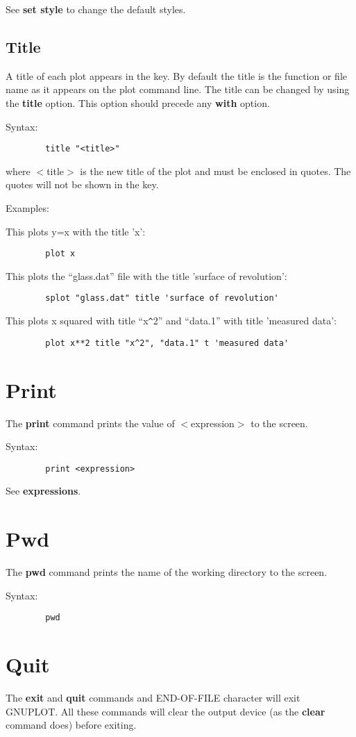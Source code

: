 See {\bf set style} to change the default styles.
\subsection{Title}
A title of each plot appears in the key. By default the title is
the function or file name as it appears on the plot command line.
The title can be changed by using the {\bf title} option. This option 
should precede any {\bf with} option.

Syntax:
\begin{verbatim}
        title "<title>"
\end{verbatim}

where $<$title$>$ is the new title of the plot and must be enclosed in
quotes. The quotes will not be shown in the key.

Examples:

This plots y=x with the title 'x':
\begin{verbatim}
        plot x
\end{verbatim}

This plots the ``glass.dat'' file with the title 'surface of revolution':
\begin{verbatim}
        splot "glass.dat" title 'surface of revolution'
\end{verbatim}

This plots x squared with title ``x\verb+^+2'' and ``data.1'' with title
'measured data':
\begin{verbatim}
        plot x**2 title "x^2", "data.1" t 'measured data'
\end{verbatim}
\section{Print}
The {\bf print} command prints the value of $<$expression$>$ to the screen.

Syntax:
\begin{verbatim}
        print <expression>
\end{verbatim}

See {\bf expressions}.
\section{Pwd}
The {\bf pwd} command prints the name of the working directory to the screen.

Syntax:
\begin{verbatim}
        pwd
\end{verbatim}
\section{Quit}
The {\bf exit} and {\bf quit} commands and END-OF-FILE character will exit
GNUPLOT. All these commands will clear the output device (as the
{\bf clear} command does) before exiting.
